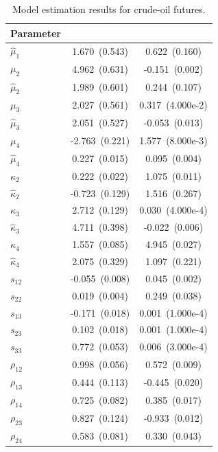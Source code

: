 \documentclass{article}
\begin{document}
\begin{table}[h!]
\centering
\caption{Model estimation results for crude-oil futures.} 
\label{tab_param_insample} 
\begin{tabular}{l S[table-format=2.3(1.3)] S[table-format=2.3(1.3)]}
\toprule
{Parameter} & {} & {} \\
\midrule
{$\widehat{\mu}_1$} & 1.670 \,(0.543) & 0.622 \,(0.160) \\
{$\mu_2$} & 4.962 \,(0.631) & -0.151 \,(0.002) \\
{$\widehat{\mu}_2$} & 1.989 \,(0.601) & 0.244 \,(0.107) \\
{$\mu_3$} & 2.027 \,(0.561) & 0.317 \,(4.000e-2) \\
{$\widehat{\mu}_3$} & 2.051 \,(0.527) & -0.053 \,(0.013) \\
{$\mu_4$} & -2.763 \,(0.221) & 1.577 \,(8.000e-3) \\
{$\widehat{\mu}_4$} & 0.227 \,(0.015) & 0.095 \,(0.004) \\
{$\kappa_2$} & 0.222 \,(0.022) & 1.075 \,(0.011) \\
{$\widehat{\kappa}_2$} & -0.723 \,(0.129) & 1.516 \,(0.267) \\
{$\kappa_3$} & 2.712 \,(0.129) & 0.030 \,(4.000e-4) \\
{$\widehat{\kappa}_3$} & 4.711 \,(0.398) & -0.022 \,(0.006) \\
{$\kappa_4$} & 1.557 \,(0.085) & 4.945 \,(0.027) \\
{$\widehat{\kappa}_4$} & 2.075 \,(0.329) & 1.097 \,(0.221) \\
{$s_{12}$} & -0.055 \,(0.008) & 0.045 \,(0.002) \\
{$s_{22}$} & 0.019 \,(0.004) & 0.249 \,(0.038) \\
{$s_{13}$} & -0.171 \,(0.018) & 0.001 \,(1.000e-4) \\
{$s_{23}$} & 0.102 \,(0.018) & 0.001 \,(1.000e-4) \\
{$s_{33}$} & 0.772 \,(0.053) & 0.006 \,(3.000e-4) \\
{$\rho_{12}$} & 0.998 \,(0.056) & 0.572 \,(0.009) \\
{$\rho_{13}$} & 0.444 \,(0.113) & -0.445 \,(0.020) \\
{$\rho_{14}$} & 0.725 \,(0.082) & 0.385 \,(0.017) \\
{$\rho_{23}$} & 0.827 \,(0.124) & -0.933 \,(0.012) \\
{$\rho_{24}$} & 0.583 \,(0.081) & 0.330 \,(0.043) \\

\end{tabular}
\end{table}
\end{document}
